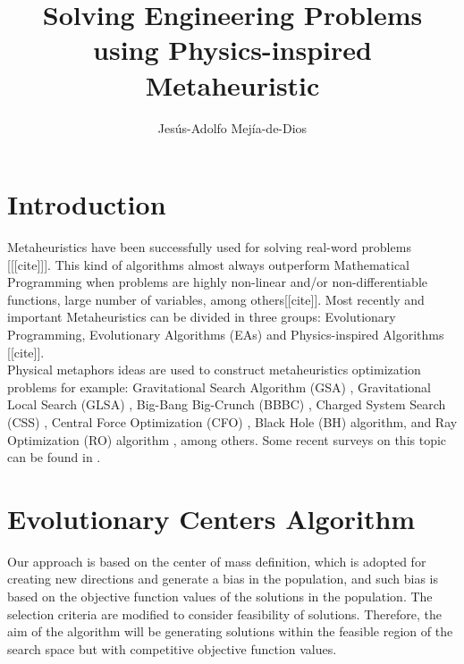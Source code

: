 \documentclass[12pt,letterpape]{article}
\title{Solving Engineering Problems using Physics-inspired Metaheuristic}
\author{Jesús-Adolfo Mejía-de-Dios}
\begin{document}
\maketitle

\section{Introduction} %
\label{sec:introduction}

Metaheuristics have been successfully used for solving real-word problems [[[cite]]].
This kind of algorithms almost always outperform Mathematical Programming when problems
are highly non-linear and/or non-differentiable functions, large number of variables, 
among others[[cite]]. Most recently and important Metaheuristics can be divided in three
groups: Evolutionary Programming, Evolutionary Algorithms (EAs) and Physics-inspired Algorithms [[cite]].\\

Physical metaphors ideas are used to construct metaheuristics optimization problems
for example: Gravitational  Search Algorithm (GSA) \cite{rashedi2009gsa}, 
Gravitational Local Search (GLSA) \cite{glsa}, Big-Bang Big-Crunch (BBBC) \cite{erol2006new}, 
Charged System Search (CSS) \cite{kaveh2010novel}, Central Force Optimization 
(CFO) \cite{cfo2007}, Black Hole (BH) \cite{hatamlou2013black} algorithm, and Ray 
Optimization (RO) algorithm \cite{kaveh2012new}, among others. Some recent surveys 
on this topic can be found in \cite{fisicaSurvey,biswas2013physics,xie2011convergence,DBLP:journals/corr/FisterYFBF13}. 

% 
\section{Evolutionary Centers Algorithm} %
\label{sec:evolutionary_centers_algorithm}

Our approach is based on the center of mass definition, which is adopted for 
creating new directions and generate a bias in the population, and such bias is 
based on the objective function values of the solutions in the population. The 
selection criteria are modified to consider feasibility of solutions. Therefore, 
the aim of the algorithm will be generating solutions within the feasible region 
of the search space but with competitive objective function values.

%
%
\end{document}
